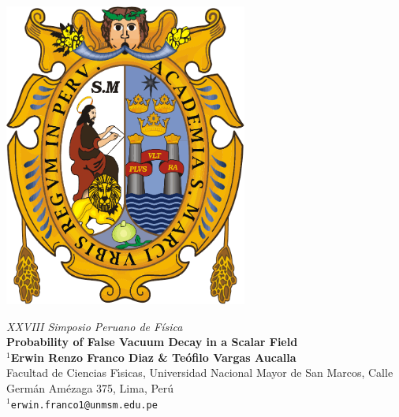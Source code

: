 \documentclass[a0,portrait]{a0poster}
\begin{document}
% 
\begin{minipage}[b]{0.15\linewidth}
\includegraphics[height=10cm]{unmsm.pdf}\\
\end{minipage}
\begin{minipage}[b]{0.7\linewidth}

\begin{center}
\huge\textit{XXVIII Simposio Peruano de F\'isica}\\[1cm] %
\Huge \color{DarkRed} \textbf{Probability of False Vacuum Decay in a Scalar Field} \color{Black}\\ %
\large \textbf{$^1$Erwin Renzo Franco Diaz \& Teófilo Vargas Aucalla}\\[0.5cm] %
\large Facultad de Ciencias Fı́sicas, Universidad Nacional Mayor de San Marcos, Calle Germ\'an Am\'ezaga 375, Lima, Per\'u\\[0.2cm] %
\texttt{$^1$erwin.franco1@unmsm.edu.pe}\\
\end{center}

\end{minipage}
\end{document}
